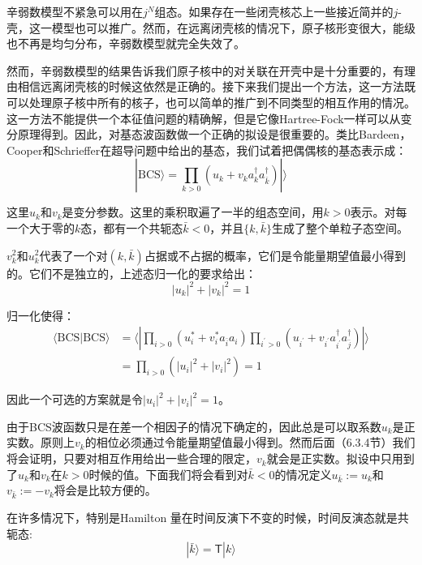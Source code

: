 辛弱数模型不紧急可以用在$j^{N}$组态。如果存在一些闭壳核芯上一些接近简并的$j$-壳，这一模型也可以推广\cite{Ta71,Ta76,LA74,Lo75}。然而，在远离闭壳核的情况下，原子核形变很大，能级也不再是均匀分布，辛弱数模型就完全失效了。

然而，辛弱数模型的结果告诉我们原子核中的对关联在开壳中是十分重要的，有理由相信远离闭壳核的时候这依然是正确的。接下来我们提出一个方法，这一方法既可以处理原子核中所有的核子，也可以简单的推广到不同类型的相互作用的情况。这一方法不能提供一个本征值问题的精确解，但是它像Hartree-Fock一样可以从变分原理得到。因此，对基态波函数做一个正确的拟设是很重要的。类比Bardeen，Cooper和Schrieffer\cite{BCS57}在超导问题中给出的基态，我们试着把偶偶核的基态表示成：
\begin{equation}
|\text{BCS}\rangle=\prod_{k>0}(u_{k}+v_{k}a^{\dagger}_{k}a^{\dagger}_{\bar{k}})|\rangle\label{eq:BCS wave function}
\end{equation}

这里$u_{k}$和$v_{k}$是变分参数。这里的乘积取遍了一半的组态空间，用$k>0$表示。对每一个大于零的$k$态，都有一个共轭态$\bar{k}<0$，并且$\{k,\bar{k}\}$生成了整个单粒子态空间。

$v^{2}_{k}$和$u^{2}_{k}$代表了一个对$(k,\bar{k})$占据或不占据的概率，它们是令能量期望值最小得到的。它们不是独立的，上述态归一化的要求给出：
\begin{equation}
|u_{k}|^{2}+|v_{k}|^{2}=1\label{eq:normalization of BCS}
\end{equation}

\begin{booknote*}
归一化使得：
\begin{align*}
\langle\text{BCS}|\text{BCS}\rangle & =\langle|\prod_{i>0}(u^{*}_{i}+v^{*}_{i}a_{\bar{i}}a_{i})\prod_{i^{\prime}>0}(u_{i^{\prime}}+v_{i^{\prime}}a^{\dagger}_{i^{\prime}}a^{\dagger}_{\bar{j}})|\rangle\\
 & =\prod_{i>0}(|u_{i}|^{2}+|v_{i}|^{2})=1
\end{align*}

因此一个可选的方案就是令$|u_{i}|^{2}+|v_{i}|^{2}=1$。
\end{booknote*}
由于BCS波函数只是在差一个相因子的情况下确定的，因此总是可以取系数$u_{k}$是正实数。原则上$v_{k}$的相位必须通过令能量期望值最小得到。然而后面（6.3.4节）我们将会证明，只要对相互作用给出一些合理的限定，$v_{k}$就会是正实数。拟设中只用到了$u_{k}$和$v_{k}$在$k>0$时候的值。下面我们将会看到对$\bar{k}<0$的情况定义$u_{\bar{k}}:=u_{k}$和$v_{\bar{k}}:=-v_{k}$将会是比较方便的。

在许多情况下，特别是Hamilton 量在时间反演下不变的时候，时间反演态就是共轭态\cite[第XV章]{Me61}:
\[
|\bar{k}\rangle=\mathsf{T}|k\rangle
\]

